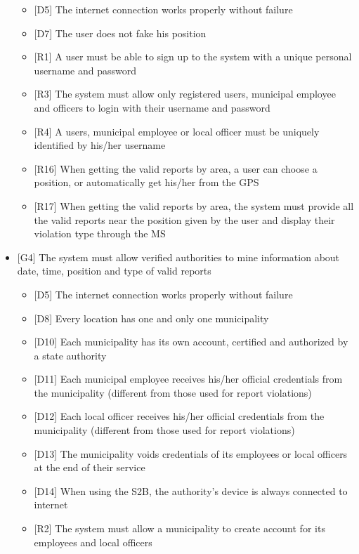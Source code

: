 \begin{itemize}
\begin{itemize}
								\item {[D5]} The internet connection works properly without failure
								\item {[D7]} The user does not fake his position
								\item {[R1]} A user must be able to sign up to the system with a unique personal username and password
								\item {[R3]} The system must allow only registered users, municipal employee and officers to login with their username and password
								\item {[R4]} A users, municipal employee or local officer must be uniquely identified by his/her username
								\item {[R16]} When getting the valid reports by area, a user can choose a position, or automatically get his/her from the GPS
								\item {[R17]} When getting the valid reports by area, the system must provide all the valid reports near the position given by the user and display their violation type through the MS
							\end{itemize}
						\item {[G4]} The system must allow verified authorities to mine information about date, time, position and type of valid reports
							\begin{itemize}
								\item {[D5]} The internet connection works properly without failure
								\item {[D8]} Every location has one and only one municipality
								\item {[D10]} Each municipality has its own account, certified and authorized by a state authority
								\item {[D11]} Each municipal employee receives his/her official credentials from the municipality (different from those used for report violations)
								\item {[D12]} Each local officer receives his/her official credentials from the municipality (different from those used for report violations)
								\item {[D13]} The municipality voids credentials of its employees or local officers at the end of their service
								\item {[D14]} When using the S2B, the authority's device is always connected to internet
								\item {[R2]} The system must allow a municipality to create account for its employees and local officers

\end{itemize}
\end{itemize}
